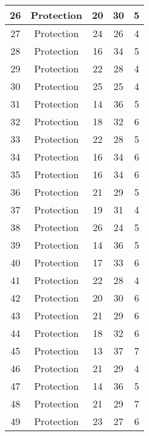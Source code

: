 \documentclass[results.tex]{subfiles}
\begin{document}
\begin{center}
\begin{tabular}{| c || c | c | c | c |}
    \hline
    26 & Protection & 20 & 30 & 5 \\ 
    \hline
    27 & Protection & 24 & 26 & 4 \\ 
    \hline
    28 & Protection & 16 & 34 & 5 \\ 
    \hline
    29 & Protection & 22 & 28 & 4 \\ 
    \hline
    30 & Protection & 25 & 25 & 4 \\ 
    \hline
    31 & Protection & 14 & 36 & 5 \\ 
    \hline
    32 & Protection & 18 & 32 & 6 \\ 
    \hline
    33 & Protection & 22 & 28 & 5 \\ 
    \hline
    34 & Protection & 16 & 34 & 6 \\ 
    \hline
    35 & Protection & 16 & 34 & 6 \\ 
    \hline
    36 & Protection & 21 & 29 & 5 \\ 
    \hline
    37 & Protection & 19 & 31 & 4 \\ 
    \hline
    38 & Protection & 26 & 24 & 5 \\ 
    \hline
    39 & Protection & 14 & 36 & 5 \\ 
    \hline
    40 & Protection & 17 & 33 & 6 \\ 
    \hline
    41 & Protection & 22 & 28 & 4 \\ 
    \hline
    42 & Protection & 20 & 30 & 6 \\ 
    \hline
    43 & Protection & 21 & 29 & 6 \\ 
    \hline
    44 & Protection & 18 & 32 & 6 \\ 
    \hline
    45 & Protection & 13 & 37 & 7 \\ 
    \hline
    46 & Protection & 21 & 29 & 4 \\ 
    \hline
    47 & Protection & 14 & 36 & 5 \\ 
    \hline
    48 & Protection & 21 & 29 & 7 \\ 
    \hline
    49 & Protection & 23 & 27 & 6 \\ 
    \hline   \end{tabular}
\end{center}
\end{document}
